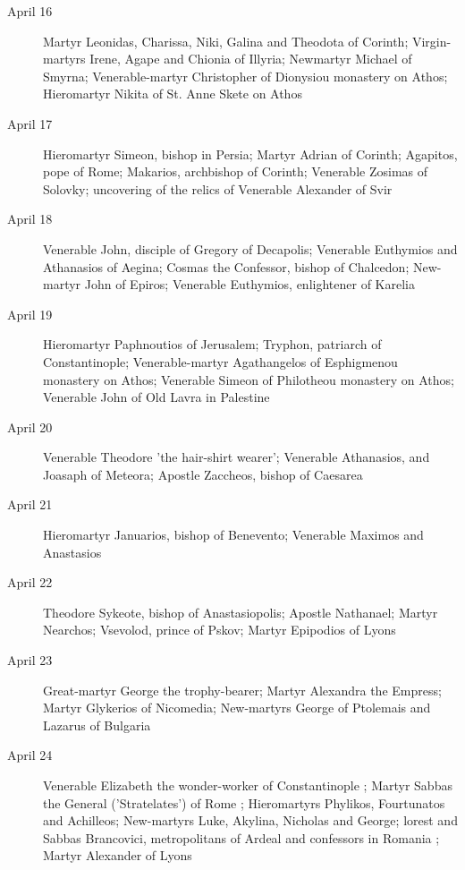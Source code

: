 \begin{description}
\item[April 16]

Martyr Leonidas, Charissa, Niki, Galina and Theodota of Corinth; Virgin-martyrs Irene, Agape and Chionia of Illyria; Newmartyr Michael of Smyrna; Venerable-martyr Christopher of Dionysiou monastery on Athos; Hieromartyr Nikita of St. Anne Skete on Athos

\item[April 17]

Hieromartyr Simeon, bishop in Persia; Martyr Adrian of Corinth; Agapitos, pope of Rome; Makarios, archbishop of Corinth; Venerable Zosimas of Solovky; uncovering of the relics of Venerable Alexander of Svir

\item[April 18]

Venerable John, disciple of Gregory of Decapolis; Venerable Euthymios and Athanasios of Aegina; Cosmas the Confessor, bishop of Chalcedon; New-martyr John of Epiros; Venerable Euthymios, enlightener of Karelia

\item[April 19]

Hieromartyr Paphnoutios of Jerusalem; Tryphon, patriarch of Constantinople; Venerable-martyr Agathangelos of Esphigmenou monastery on Athos; Venerable Simeon of Philotheou monastery on Athos; Venerable John of Old Lavra in Palestine

\item[April 20]

Venerable Theodore 'the hair-shirt wearer'; Venerable Athanasios, and Joasaph of Meteora; Apostle Zaccheos, bishop of Caesarea

\item[April 21]

Hieromartyr Januarios, bishop of Benevento; Venerable Maximos and Anastasios

\item[April 22]

Theodore Sykeote, bishop of Anastasiopolis; Apostle Nathanael; Martyr Nearchos; Vsevolod, prince of Pskov; Martyr Epipodios of Lyons

\item[April 23]

Great-martyr George the trophy-bearer; Martyr Alexandra the Empress; Martyr Glykerios of Nicomedia; New-martyrs George of Ptolemais and Lazarus of Bulgaria

\item[April 24]

Venerable Elizabeth the wonder-worker of Constantinople ; Martyr Sabbas the General ('Stratelates') of Rome ; Hieromartyrs Phylikos, Fourtunatos and Achilleos; New-martyrs Luke, Akylina, Nicholas and George; lorest and Sabbas Brancovici, metropolitans of Ardeal and confessors in Romania ; Martyr Alexander of Lyons


\end{description}
